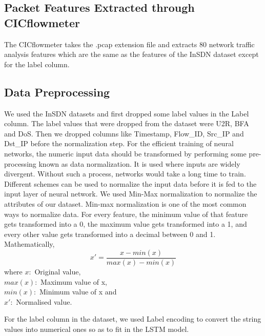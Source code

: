 \subsection{Packet Features Extracted through CICflowmeter}
\vspace{-18pt}
The CICflowmeter takes the .pcap extension file and extracts 80 network traffic analysis features which are the same as the features of the InSDN dataset except for the label column.
\subsection{Data Preprocessing}
\vspace{-18pt}
We used the InSDN datasets and first dropped some label values in the Label column. The label values that were dropped from the dataset were U2R, BFA and DoS. Then we dropped columns like Timestamp, Flow\_ID, Src\_IP and Dst\_IP before the normalization step. For the efficient training of neural networks, the numeric input data should be transformed by performing some pre-processing known as data normalization. It is used where inputs are widely divergent. Without such a process, networks would take a long time to train. Different schemes can be used to normalize the input data before it is fed to the input layer of neural network. We used Min-Max normalization to normalize the attributes of our dataset. Min-max normalization is one of the most common ways to normalize data. For every feature, the minimum value of that feature gets transformed into a 0, the maximum value gets transformed into a 1, and every other value gets transformed into a decimal between 0 and 1. Mathematically,
\begin{equation}
x' = \frac{x- min(x)}{max(x)-min(x)}
\end{equation}
where $x: $ Original value,\\ $max(x): $ Maximum value of x,\\ $min(x): $ Minimum value of x and \\ 
$x': $ Normalised value. \par 
For the label column in the dataset, we used Label encoding to convert the string values into numerical ones so as to fit in the LSTM model. 
